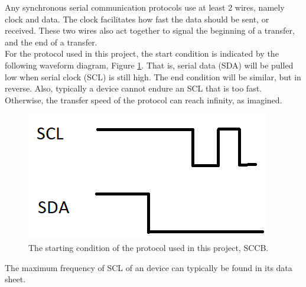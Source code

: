 \documentclass{article}
\begin{document}
		Any synchronous serial communication protocols use at least 2 wires, namely clock and data. The clock facilitates how fast the data should be sent, or received. These two wires also act together to signal the beginning of a transfer, and the end of a transfer.
	\\
		
		For the protocol used in this project, the start condition is indicated by the following waveform diagram, Figure \ref{fig:wavewave}. That is, serial data (SDA) will be pulled low when serial clock (SCL) is still high. The end condition will be similar, but in reverse. Also, typically a device cannot endure an SCL that is too fast. Otherwise, the transfer speed of the protocol can reach infinity, as imagined.
	\\
		
	\begin{figure}[h]
		\centering
		\includegraphics[scale=0.5]{wavewave}
		\caption{The starting condition of the protocol used in this project, SCCB.}
		\label{fig:wavewave}
	\end{figure}
		
		The maximum frequency of SCL of an device can typically be found in its data sheet.
		
\end{document}
